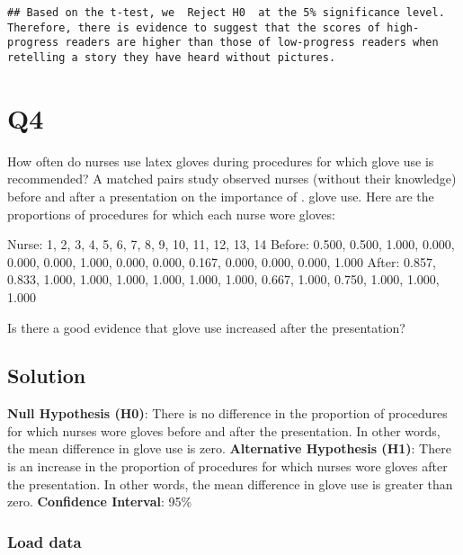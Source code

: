 \documentclass[
]{article}
\begin{document}
\begin{verbatim}
## Based on the t-test, we  Reject H0  at the 5% significance level. Therefore, there is evidence to suggest that the scores of high-progress readers are higher than those of low-progress readers when retelling a story they have heard without pictures.
\end{verbatim}

\hypertarget{q4}{%
\section{Q4}\label{q4}}

How often do nurses use latex gloves during procedures for which glove
use is recommended? A matched pairs study observed nurses (without their
knowledge) before and after a presentation on the importance of . glove
use. Here are the proportions of procedures for which each nurse wore
gloves:

Nurse: 1, 2, 3, 4, 5, 6, 7, 8, 9, 10, 11, 12, 13, 14 Before: 0.500,
0.500, 1.000, 0.000, 0.000, 0.000, 1.000, 0.000, 0.000, 0.167, 0.000,
0.000, 0.000, 1.000 After: 0.857, 0.833, 1.000, 1.000, 1.000, 1.000,
1.000, 1.000, 0.667, 1.000, 0.750, 1.000, 1.000, 1.000

Is there a good evidence that glove use increased after the
presentation?

\hypertarget{solution-3}{%
\subsection{Solution}\label{solution-3}}

\textbf{Null Hypothesis (H0)}: There is no difference in the proportion
of procedures for which nurses wore gloves before and after the
presentation. In other words, the mean difference in glove use is zero.
\textbf{Alternative Hypothesis (H1)}: There is an increase in the
proportion of procedures for which nurses wore gloves after the
presentation. In other words, the mean difference in glove use is
greater than zero. \textbf{Confidence Interval}: 95\%

\hypertarget{load-data-3}{%
\subsubsection{Load data}\label{load-data-3}}
\end{document}

